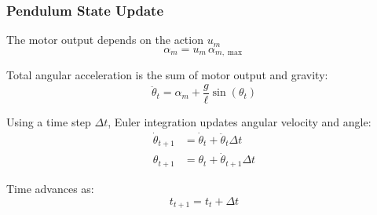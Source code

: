 \documentclass[aspectratio=169,11pt,xcolor=dvipsnames]{beamer}
\begin{document}
\begin{frame}
  \frametitle{Pendulum State Update}
  \begin{center}
    \begin{minipage}{.8\textwidth}
      The motor output depends on the action $u_m$
      \begin{equation*}
        \alpha_m = u_m \,\alpha_{m,\max}
      \end{equation*}

      Total angular acceleration is the sum of motor output and gravity:
      \begin{equation*}
        \ddot{\theta}_t = \alpha_m + \frac{g}{\ell}\sin(\theta_t)
      \end{equation*}

      Using a time step $\Delta t$, Euler integration updates angular velocity and angle:
      \begin{align*}
        \dot{\theta}_{t+1} &= \dot{\theta}_t + \ddot{\theta}_t \Delta t\\
        \theta_{t+1} &= \theta_t + \dot{\theta}_{t+1}\Delta t
      \end{align*}

      Time advances as:
      \begin{equation*}
        t_{t+1} = t_t + \Delta t
      \end{equation*}
    \end{minipage}
  \end{center}
\end{frame}
\end{document}
